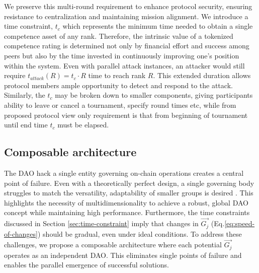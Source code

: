 \documentclass{article}
\begin{document}
\begin{CJK}{UTF8}{gbsn}
\begin{multicols}{2}
            We preserve this multi-round requirement to enhance protocol security, ensuring resistance to centralization and maintaining mission alignment. We introduce a time constraint,  $t_c$ which represents the minimum time needed to obtain a single competence asset of any rank.
            Therefore, the intrinsic value of a tokenized competence rating is determined not only by financial effort and success among peers but also by the time invested in continuously improving one's position within the system. Even with parallel attack instances, an attacker would still require $t_{attack}(R) = t_c \cdot R$ time to reach rank $R$. This extended duration allows protocol members ample opportunity to detect and respond to the attack. Similarly, the $t_c$ may be broken down to smaller components, giving participants ability to leave or cancel a tournament, specify round times etc, while from proposed protocol view only requirement is that from beginning of tournament until end time $t_c$ must be elapsed.


            \subsection{Composable architecture}
            The DAO hack\cite{Liu2021} a single entity governing on-chain operations creates a central point of failure. Even with a theoretically perfect design, a single governing body struggles to match the versatility, adaptability of smaller groups is desired \cite{Buterin22}.  This highlights the necessity of multidimensionality to achieve a robust, global DAO concept while maintaining high performance.
            Furthermore, the time constraints discussed in Section \ref{sec:time-constraint} imply that changes in ${\vec{G_j}}$ (Eq.\ref{eq:speed-of-changes}) should be gradual, even under ideal conditions.
            To address these challenges, we propose a composable architecture where each potential ${\vec{G_j}}$ operates as an independent DAO. This eliminates single points of failure and enables the parallel emergence of successful solutions.


\end{multicols}
\end{CJK}
\end{document}

